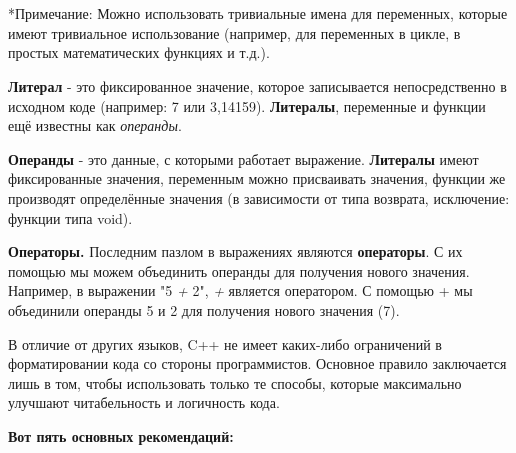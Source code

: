 \documentclass[a4paper,16pt]{report} %
\begin{document}
\\
\\ %
\begin{sloppypar} %
*Примечание: Можно использовать тривиальные имена для переменных,
которые имеют тривиальное использование (например, для переменных в
цикле, в простых математических функциях и т.д.).
\end{sloppypar}
\begin{sloppypar}
\textbf{Литерал} - это фиксированное значение, которое записывается непосредственно в исходном коде (например: 7 или 3,14159). \textbf{Литералы}, переменные и функции ещё известны как \textit{операнды}.
\end{sloppypar}

\begin{sloppypar}
\textbf{Операнды} - это данные, с которыми работает выражение. \textbf{Литералы} имеют фиксированные значения, переменным можно присваивать значения, функции же производят определённые значения (в зависимости от типа возврата, исключение: функции типа void).
\end{sloppypar}

\textbf{Операторы.}
Последним пазлом в выражениях являются \textbf{операторы}. С их помощью мы можем объединить операнды для получения нового значения. Например, в выражении "5 \textit{+} 2", \textit{+} является оператором. С помощью + мы объединили операнды 5 и 2 для получения нового значения (7).
\\
\begin{sloppypar}
В отличие от других языков, C++ не имеет каких-либо ограничений в форматировании кода со стороны программистов. Основное правило заключается лишь в том, чтобы использовать только те способы, которые максимально улучшают читабельность и логичность кода.
\end{sloppypar}

\begin{center}
	\textbf{Вот пять основных рекомендаций:}
\end{center}
\end{document}
